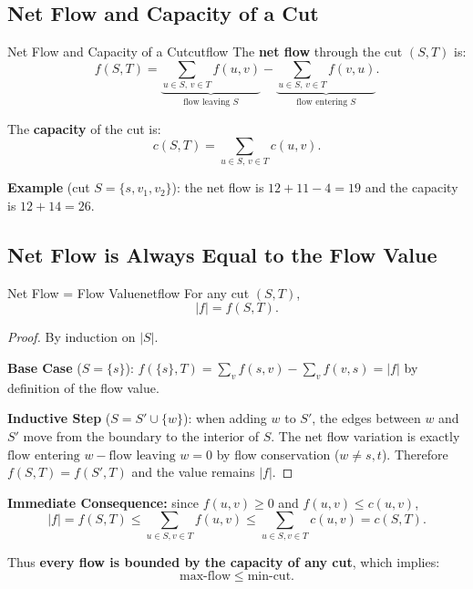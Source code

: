 \subsection{Net Flow and Capacity of a Cut}

\begin{definition}{Net Flow and Capacity of a Cut}{cutflow}
The \textbf{net flow} through the cut $(S, T)$ is:
\[
  f(S, T) = \underbrace{\sum_{u \in S,\, v \in T} f(u,v)}_{\text{flow leaving }S}
            - \underbrace{\sum_{u \in S,\, v \in T} f(v,u)}_{\text{flow entering }S}.
\]

The \textbf{capacity} of the cut is:
\[
  c(S, T) = \sum_{u \in S,\, v \in T} c(u, v).
\]
\end{definition}

\textbf{Example} (cut $S = \{s, v_1, v_2\}$):
the net flow is $12 + 11 - 4 = 19$ and the capacity is $12 + 14 = 26$.

\subsection{Net Flow is Always Equal to the Flow Value}

\begin{theorem}{Net Flow = Flow Value}{netflow}
For any cut $(S, T)$,
\[
  |f| = f(S, T).
\]
\end{theorem}

\begin{proof}
By induction on $|S|$.

\textbf{Base Case} ($S = \{s\}$): $f(\{s\}, T) = \sum_v f(s,v) - \sum_v f(v,s) = |f|$
by definition of the flow value.

\textbf{Inductive Step} ($S = S' \cup \{w\}$): when adding $w$ to $S'$,
the edges between $w$ and $S'$ move from the boundary to the interior of $S$.
The net flow variation is exactly
$\text{flow entering }w - \text{flow leaving }w = 0$
by flow conservation ($w \ne s, t$). Therefore $f(S, T) = f(S', T)$ and the value remains $|f|$.
\end{proof}

\textbf{Immediate Consequence:} since $f(u,v) \ge 0$ and $f(u,v) \le c(u,v)$,
\[
  |f| = f(S,T) \le \sum_{u \in S, v \in T} f(u,v) \le \sum_{u \in S, v \in T} c(u,v) = c(S,T).
\]

Thus \textbf{every flow is bounded by the capacity of any cut}, which implies:
\[
  \text{max-flow} \le \text{min-cut}.
\]

